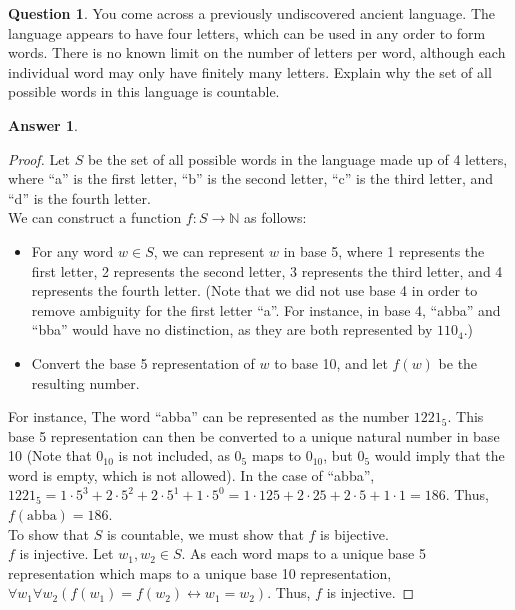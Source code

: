 \documentclass[article, 12pt]{article}
\theoremstyle{definition}
\newtheorem{question}{Question}
\newtheorem{answer}{Answer}
\newcommand{\nats}{\mathbb{N}}
\begin{document}
    \begin{question} \label{q:language}
        You come across a previously undiscovered ancient language. The language appears to have four letters, which can be used in any order to form words. There is no known limit on the number of letters per word, although each individual word may only have finitely many letters. Explain why the set of all possible words in this language is countable.
    \end{question}

    \begin{answer} \
        \begin{proof}
            Let $S$ be the set of all possible words in the language made up of 4 letters, where ``a'' is the first letter, ``b'' is the second letter, ``c'' is the third letter, and ``d'' is the fourth letter.
            \\[12pt]
            We can construct a function $f: S \to \nats$ as follows: 
            \begin{itemize}
                \item For any word $w \in S$, we can represent $w$ in base 5, where 1 represents the first letter, 2 represents the second letter, 3 represents the third letter, and 4 represents the fourth letter. (Note that we did not use base 4 in order to remove ambiguity for the first letter ``a''. For instance, in base 4, ``abba'' and ``bba'' would have no distinction, as they are both represented by $110_4$.) 
                \item Convert the base 5 representation of $w$ to base 10, and let $f(w)$ be the resulting number.
            \end{itemize}
            For instance, The word ``abba'' can be represented as the number $1221_5$. This base 5 representation can then be converted to a unique natural number in base 10 (Note that $0_{10}$ is not included, as $0_5$ maps to $0_{10}$, but $0_5$ would imply that the word is empty, which is not allowed). In the case of ``abba'', $1221_5 = 1 \cdot 5^3 + 2 \cdot 5^2 + 2 \cdot 5^1 + 1 \cdot 5^0 = 1 \cdot 125 + 2 \cdot 25 + 2 \cdot 5 + 1 \cdot 1 = 186$. Thus, $f(\text{abba}) = 186$.
            \\[12pt]
            To show that $S$ is countable, we must show that $f$ is bijective.
            \\[12pt]
            $f$ is injective. Let $w_1, w_2 \in S$. As each word maps to a unique base 5 representation which maps to a unique base 10 representation, $\forall w_1 \forall w_2 (f(w_1) = f(w_2) \leftrightarrow w_1 = w_2)$. Thus, $f$ is injective.

\end{proof}
\end{answer}
\end{document}
